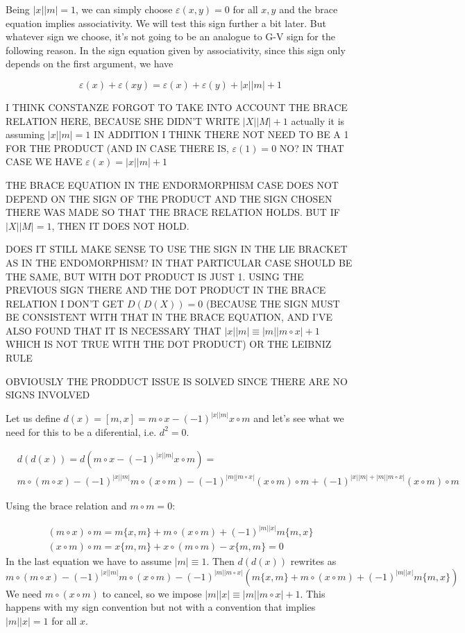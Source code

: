 \documentclass[twoside]{article}
\begin{document}
Being $|x||m|=1$, we can simply choose $\varepsilon(x,y)=0$ for all $x,y$ and the brace equation implies associativity. We will test this sign further a bit later. But whatever sign we choose, it's not going to be an analogue to G-V sign for the following reason. In the sign equation given by associativity, since this sign only depends on the first argument, we have

$$\varepsilon(x)+\varepsilon(xy)=\varepsilon(x)+\varepsilon(y)+|x||m|+1$$

I THINK CONSTANZE FORGOT TO TAKE INTO ACCOUNT THE BRACE RELATION HERE, BECAUSE SHE DIDN'T WRITE $|X||M|+1$ actually it is assuming $|x||m|=1$ IN ADDITION I THINK THERE NOT NEED TO BE A 1 FOR THE PRODUCT (AND IN CASE THERE IS, $\varepsilon(1)=0$ NO? IN THAT CASE WE HAVE $\varepsilon(x)=|x||m|+1$ %

THE BRACE EQUATION IN THE ENDORMORPHISM CASE DOES NOT DEPEND ON THE SIGN OF THE PRODUCT AND THE SIGN CHOSEN THERE WAS MADE SO THAT THE BRACE RELATION HOLDS. BUT IF $|X||M|=1$, THEN IT DOES NOT HOLD. 


DOES IT STILL MAKE SENSE TO USE THE SIGN IN THE LIE BRACKET AS IN THE ENDOMORPHISM? IN THAT PARTICULAR CASE SHOULD BE THE SAME, BUT WITH DOT PRODUCT IS JUST 1. USING THE PREVIOUS SIGN THERE AND THE DOT PRODUCT IN THE BRACE RELATION I DON'T GET $D(D(X))=0$ (BECAUSE THE SIGN MUST BE CONSISTENT WITH THAT IN THE BRACE EQUATION, AND I'VE ALSO FOUND THAT IT IS NECESSARY THAT $|x||m|\equiv |m||m\circ x|+1$ WHICH IS NOT TRUE WITH THE DOT PRODUCT) OR THE LEIBNIZ RULE 

OBVIOUSLY THE PRODDUCT ISSUE IS SOLVED SINCE THERE ARE NO SIGNS INVOLVED

Let us define $d(x)=[m,x]=m\circ x-(-1)^{|x||m|}x\circ m$ and let's see what we need for this to be a diferential, i.e. $d^2=0$. 

\begin{align*}
&d(d(x))=d(m\circ x-(-1)^{|x||m|}x\circ m)=\\
&m\circ (m\circ x)-(-1)^{|x||m|}m\circ(x\circ m)-(-1)^{|m||m\circ x|}(x\circ m)\circ m +(-1)^{|x||m|+|m||m\circ x|}(x\circ m)\circ m
\end{align*}

Using the brace relation and $m\circ m=0$:

\begin{align*}
(m\circ x)\circ m= m\{x,m\}+m\circ(x \circ m)+(-1)^{|m||x|}m\{m,x\}\\
(x\circ m)\circ m=x\{m,m\}+x\circ (m\circ m)-x\{m,m\}=0
\end{align*}
In the last equation we have to assume $|m|\equiv 1$. Then $d(d(x))$ rewrites as
 \[
 m\circ (m\circ x)-(-1)^{|x||m|}m\circ(x\circ m)-(-1)^{|m||m\circ x|}(m\{x,m\}+m\circ(x \circ m)+(-1)^{|m||x|}m\{m,x\})
 \]
 We need $m\circ(x\circ m)$ to cancel, so we impose $|m||x|\equiv |m||m\circ x|+1$. This happens with my sign convention but not with a convention that implies $|m||x|=1$ for all $x$.
 
\end{document}
